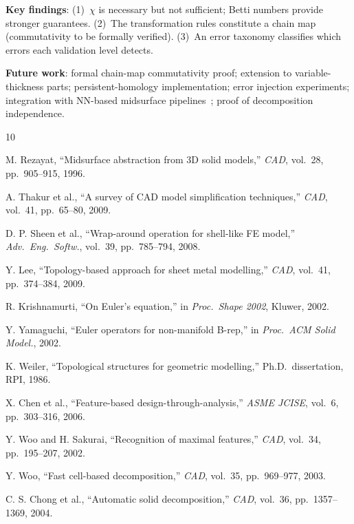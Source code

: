 \documentclass[journal,twocolumn,10pt]{IEEEtran}
\newcommand{\Euler}{\chi}
\begin{document}
\textbf{Key findings}: (1)~$\Euler$ is necessary but not sufficient; Betti
numbers provide stronger guarantees. (2)~The transformation rules constitute
a chain map (commutativity to be formally verified). (3)~An error taxonomy
classifies which errors each validation level detects.

\textbf{Future work}: formal chain-map commutativity proof; extension to
variable-thickness parts; persistent-homology implementation; error injection
experiments; integration with NN-based midsurface
pipelines~\cite{MidcurveNN2025}; proof of decomposition independence.


\begin{thebibliography}{10}

M. Rezayat, ``Midsurface abstraction from 3D solid models,''
\emph{CAD}, vol.~28, pp.~905--915, 1996.

A. Thakur et al., ``A survey of CAD model simplification techniques,''
\emph{CAD}, vol.~41, pp.~65--80, 2009.

D. P. Sheen et al., ``Wrap-around operation for shell-like FE model,''
\emph{Adv.\ Eng.\ Softw.}, vol.~39, pp.~785--794, 2008.

Y. Lee, ``Topology-based approach for sheet metal modelling,''
\emph{CAD}, vol.~41, pp.~374--384, 2009.

R. Krishnamurti, ``On Euler's equation,'' in \emph{Proc.\ Shape 2002},
Kluwer, 2002.

Y. Yamaguchi, ``Euler operators for non-manifold B-rep,''
in \emph{Proc.\ ACM Solid Model.}, 2002.

K. Weiler, ``Topological structures for geometric modelling,''
Ph.D.\ dissertation, RPI, 1986.

X. Chen et al., ``Feature-based design-through-analysis,''
\emph{ASME JCISE}, vol.~6, pp.~303--316, 2006.

Y. Woo and H. Sakurai, ``Recognition of maximal features,''
\emph{CAD}, vol.~34, pp.~195--207, 2002.

Y. Woo, ``Fast cell-based decomposition,''
\emph{CAD}, vol.~35, pp.~969--977, 2003.

C. S. Chong et al., ``Automatic solid decomposition,''
\emph{CAD}, vol.~36, pp.~1357--1369, 2004.


\end{thebibliography}
\end{document}
